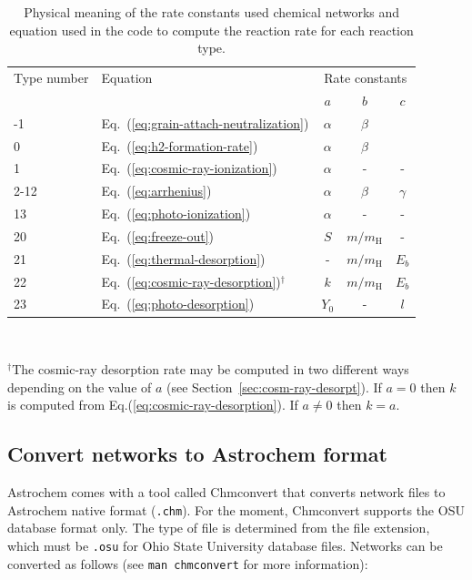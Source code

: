 \documentclass[a4paper,12pt]{article}
\begin{document}
\begin{table}
    \renewcommand{\footnoterule}{}  
    \begin{center}
      \caption{Physical meaning of the rate constants used chemical
        networks and equation used in the code to compute the reaction
        rate for each reaction type.}
      \begin{tabular}{llccc}
        \hline
        \hline
        Type number & Equation & \multicolumn{3}{c}{Rate constants}\\
        \cline{3-5}
        & & $a$ & $b$ & $c$\\
        \hline
        -1    & Eq.~(\ref{eq:grain-attach-neutralization}) & $\alpha$ & $\beta$\\
        0     & Eq.~(\ref{eq:h2-formation-rate}) & $\alpha$ & $\beta$\\
        1     & Eq.~(\ref{eq:cosmic-ray-ionization}) & $\alpha$ & - & -\\
        2-12  & Eq.~(\ref{eq:arrhenius}) & $\alpha$ & $\beta$ & $\gamma$\\
        13    & Eq.~(\ref{eq:photo-ionization}) & $\alpha$ & - & -\\
        20    & Eq.~(\ref{eq:freeze-out}) & $S$ & $m/m_\mathrm{H}$ & -\\
        21    & Eq.~(\ref{eq:thermal-desorption}) & - & $m/m_\mathrm{H}$ & $E_{b}$\\
        22    & Eq.~(\ref{eq:cosmic-ray-desorption})$^\dagger$ & $k$ & $m/m_\mathrm{H}$ & $E_{b}$\\
        23    & Eq.~(\ref{eq:photo-desorption}) & $Y_{0}$ & - & $l$\\
        \hline
    \end{tabular}
    \\ \parbox{12cm}{\footnotesize $^\dagger$The cosmic-ray desorption
      rate may be computed in two different ways depending on the
      value of $a$ (see Section~\ref{sec:cosm-ray-desorpt}). If $a =
      0$ then $k$ is computed from
      Eq.(\ref{eq:cosmic-ray-desorption}). If $a \ne 0$ then $k = a$.}
    \label{tab:rate-const-meaning}
  \end{center}
\end{table}

\subsection{Convert networks to Astrochem format}
\label{sec:conv-netw-astr}

Astrochem comes with a tool called Chmconvert that converts network
files to Astrochem native format (\verb=.chm=). For the moment,
Chmconvert supports the OSU database format only. The type of file is
determined from the file extension, which must be \verb=.osu= for Ohio
State University database files. Networks can be converted as follows
(see \verb=man chmconvert= for more information):
\end{document}
